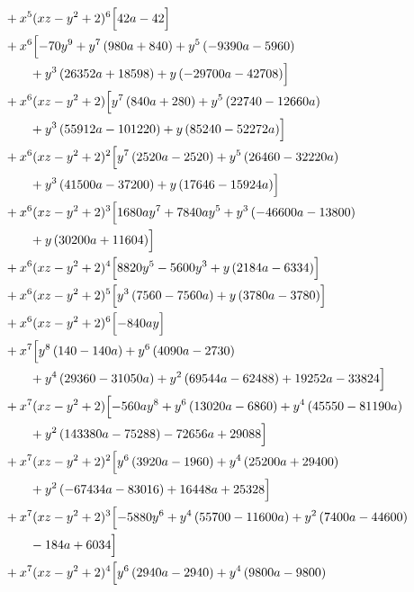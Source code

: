 \begin{align*}
&{}+x^{5}(xz-y^2+2)^{6}\Bigl[42 a - 42\Bigr]\\
&{}+x^{6}\Bigl[- 70 y^{9} + y^{7} \left(980 a + 840\right) + y^{5} \left(- 9390 a - 5960\right)\\
&\qquad + y^{3} \left(26352 a + 18598\right) + y \left(- 29700 a - 42708\right)\Bigr]\\
&{}+x^{6}(xz-y^2+2)\Bigl[y^{7} \left(840 a + 280\right) + y^{5} \left(22740 - 12660 a\right)\\
&\qquad + y^{3} \left(55912 a - 101220\right) + y \left(85240 - 52272 a\right)\Bigr]\\
&{}+x^{6}(xz-y^2+2)^{2}\Bigl[y^{7} \left(2520 a - 2520\right) + y^{5} \left(26460 - 32220 a\right)\\
&\qquad + y^{3} \left(41500 a - 37200\right) + y \left(17646 - 15924 a\right)\Bigr]\\
&{}+x^{6}(xz-y^2+2)^{3}\Bigl[1680 a y^{7} + 7840 a y^{5} + y^{3} \left(- 46600 a - 13800\right)\\
&\qquad + y \left(30200 a + 11604\right)\Bigr]\\
&{}+x^{6}(xz-y^2+2)^{4}\Bigl[8820 y^{5} - 5600 y^{3} + y \left(2184 a - 6334\right)\Bigr]\\
&{}+x^{6}(xz-y^2+2)^{5}\Bigl[y^{3} \left(7560 - 7560 a\right) + y \left(3780 a - 3780\right)\Bigr]\\
&{}+x^{6}(xz-y^2+2)^{6}\Bigl[- 840 a y\Bigr]\\
&{}+x^{7}\Bigl[y^{8} \left(140 - 140 a\right) + y^{6} \left(4090 a - 2730\right)\\
&\qquad + y^{4} \left(29360 - 31050 a\right) + y^{2} \left(69544 a - 62488\right) + 19252 a - 33824\Bigr]\\
&{}+x^{7}(xz-y^2+2)\Bigl[- 560 a y^{8} + y^{6} \left(13020 a - 6860\right) + y^{4} \left(45550 - 81190 a\right)\\
&\qquad + y^{2} \left(143380 a - 75288\right) - 72656 a + 29088\Bigr]\\
&{}+x^{7}(xz-y^2+2)^{2}\Bigl[y^{6} \left(3920 a - 1960\right) + y^{4} \left(25200 a + 29400\right)\\
&\qquad + y^{2} \left(- 67434 a - 83016\right) + 16448 a + 25328\Bigr]\\
&{}+x^{7}(xz-y^2+2)^{3}\Bigl[- 5880 y^{6} + y^{4} \left(55700 - 11600 a\right) + y^{2} \left(7400 a - 44600\right)\\
&\qquad - 184 a + 6034\Bigr]\\
&{}+x^{7}(xz-y^2+2)^{4}\Bigl[y^{6} \left(2940 a - 2940\right) + y^{4} \left(9800 a - 9800\right)\\

\end{align*}
